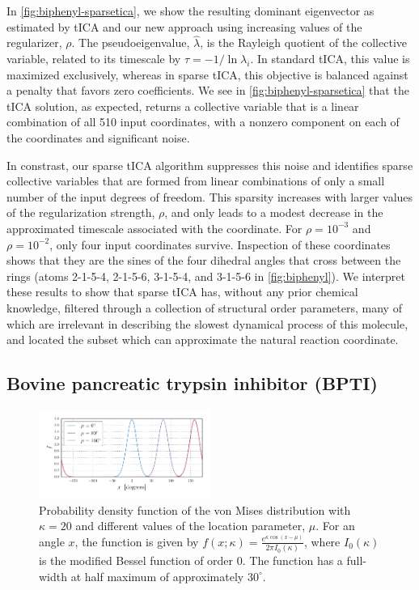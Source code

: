 \documentclass[aip, jcp, reprint, nolinenumbers, twocolumn, nobalancelastpage, nofootinbib]{revtex4-1}
\begin{document}
In \cref{fig:biphenyl-sparsetica}, we show the resulting dominant eigenvector as estimated by tICA and our new approach using increasing values of the regularizer, $\rho$. The pseudoeigenvalue, $\hat{\lambda}$, is the Rayleigh quotient of the collective variable, related to its timescale by $\hat{\tau}=-1/ \ln \lambda_i$. In standard tICA, this value is maximized exclusively, whereas in sparse tICA, this objective is balanced against a penalty that favors zero coefficients. We see in \cref{fig:biphenyl-sparsetica} that the tICA solution, as expected, returns a collective variable that is a linear  combination of all 510 input coordinates, with a nonzero component on each of the coordinates and significant noise.

In constrast, our sparse tICA algorithm suppresses this noise and identifies sparse collective variables that are formed from linear combinations of only a small number of the input degrees of freedom. This sparsity increases with larger values of the regularization strength, $\rho$, and only leads to a modest decrease in the approximated timescale associated with the coordinate. For $\rho=10^{-3}$ and $\rho=10^{-2}$, only four input coordinates survive. Inspection of these coordinates shows that they are the sines of the four dihedral angles that cross between the rings (atoms 2-1-5-4, 2-1-5-6, 3-1-5-4, and 3-1-5-6 in \cref{fig:biphenyl}). We interpret these results to show that sparse tICA has, without any prior chemical knowledge, filtered through a collection of structural order parameters, many of which are irrelevant in describing the slowest dynamical process of this molecule, and located the subset which can approximate the natural reaction coordinate.


\subsection{Bovine pancreatic trypsin inhibitor (BPTI)}

\begin{figure}
    \centering
    \includegraphics[width=0.5\textwidth]{von-mises-crop.pdf}
    \caption{\label{fig:vonmises} Probability density function of the von Mises distribution with $\kappa=20$ and different values of the location parameter, $\mu$. For an angle $x$, the function is given by $f(x;\kappa) = \frac{e^{\kappa \cos(x-\mu)}}{2\pi I_0(\kappa)}$, where $I_0(\kappa)$ is the modified Bessel function of order 0. The function has a full-width at half maximum of approximately $30^\circ$.}
\end{figure}
\end{document}
